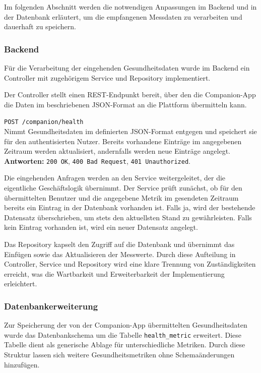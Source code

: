 \documentclass[12pt,a4paper]{report}
\begin{document}
Im folgenden Abschnitt werden die notwendigen Anpassungen im Backend und in der Datenbank erläutert, um die empfangenen
Messdaten zu verarbeiten und dauerhaft zu speichern.

\subsubsection{Backend}

Für die Verarbeitung der eingehenden Gesundheitsdaten wurde im Backend ein Controller mit zugehörigem Service und Repository
implementiert. 

Der Controller stellt einen REST-Endpunkt bereit, über den die Companion-App die Daten im beschriebenen JSON-Format an die
Plattform übermitteln kann. 

\begin{description}
  \item \texttt{POST /companion/health} \\
        Nimmt Gesundheitsdaten im definierten JSON-Format entgegen und speichert sie für den authentisierten Nutzer. 
        Bereits vorhandene Einträge im angegebenen Zeitraum werden aktualisiert, andernfalls werden neue Einträge angelegt. \\
        \textbf{Antworten:} \texttt{200 OK}, \texttt{400 Bad Request}, \texttt{401 Unauthorized}.
\end{description}

Die eingehenden Anfragen werden an den Service weitergeleitet, der die eigentliche Geschäftslogik übernimmt. Der Service prüft
zunächst, ob für den übermittelten Benutzer und die angegebene Metrik im gesendeten Zeitraum bereits ein Eintrag in der Datenbank
vorhanden ist. Falls ja, wird der bestehende Datensatz überschrieben, um stets den aktuellsten Stand zu gewährleisten. Falls kein
Eintrag vorhanden ist, wird ein neuer Datensatz angelegt.  

Das Repository kapselt den Zugriff auf die Datenbank und übernimmt das Einfügen sowie das Aktualisieren der Messwerte. Durch diese
Aufteilung in Controller, Service und Repository wird eine klare Trennung von Zuständigkeiten erreicht, was die Wartbarkeit und
Erweiterbarkeit der Implementierung erleichtert.

\subsubsection{Datenbankerweiterung}

Zur Speicherung der von der Companion-App übermittelten Gesundheitsdaten wurde das Datenbankschema um die Tabelle 
\texttt{health\_metric} erweitert. Diese Tabelle dient als generische Ablage für unterschiedliche Metriken. Durch diese Struktur
lassen sich weitere Gesundheitsmetriken ohne Schemaänderungen hinzufügen.  
\end{document}
